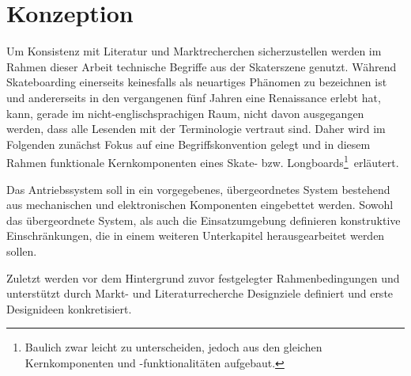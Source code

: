 \chapter{Konzeption}\label{sec:conception}
%
%
%
%
%
%
	Um Konsistenz mit Literatur und Marktrecherchen sicherzustellen werden im Rahmen dieser Arbeit technische Begriffe aus der Skaterszene genutzt.
	Während Skateboarding einerseits keinesfalls als neuartiges Phänomen zu bezeichnen ist und andererseits in den vergangenen fünf Jahren eine Renaissance erlebt hat, kann, gerade im nicht-englischsprachigen Raum, nicht davon ausgegangen werden, dass alle Lesenden mit der Terminologie vertraut sind.
	Daher wird im Folgenden zunächst Fokus auf eine Begriffskonvention gelegt und in diesem Rahmen funktionale Kernkomponenten eines Skate- bzw. Longboards\footnote{\hspace{1mm} Baulich zwar leicht zu unterscheiden, jedoch aus den gleichen Kernkomponenten und -funktionalitäten aufgebaut.}~erläutert.\par\medskip
	Das Antriebssystem soll in ein vorgegebenes, übergeordnetes System bestehend aus mechanischen und elektronischen Komponenten eingebettet werden.
	Sowohl das übergeordnete System, als auch die Einsatzumgebung definieren konstruktive Einschränkungen, die in einem weiteren Unterkapitel herausgearbeitet werden sollen.\par\medskip
	Zuletzt werden vor dem Hintergrund zuvor festgelegter Rahmenbedingungen und unterstützt durch Markt- und Literaturrecherche Designziele definiert und erste Designideen konkretisiert.
